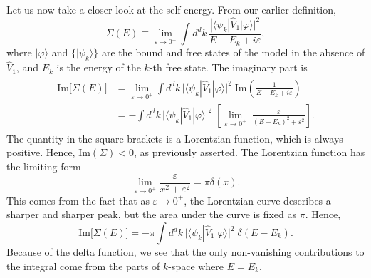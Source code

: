 \documentclass[pra,12pt]{revtex4}
\begin{document}
Let us now take a closer look at the self-energy.  From our earlier
definition,
\begin{equation}
  \Sigma(E) \equiv \lim_{\varepsilon\rightarrow0^+} \int d^dk\, \frac{\displaystyle| \langle\psi_k| \hat{V}_1|\varphi\rangle|^2}{\displaystyle E-E_k+i\varepsilon},
\end{equation}
where $|\varphi\rangle$ and $\{|\psi_k\rangle\}$ are the bound and
free states of the model in the absence of $\hat{V}_1$, and $E_k$ is
the energy of the $k$-th free state.  The imaginary part is
\begin{align}
  \begin{aligned}\mathrm{Im}\big[\Sigma(E)\big] &= \lim_{\varepsilon\rightarrow0^+} \int d^dk\, \Big| \langle\psi_k| \hat{V}_1|\varphi\rangle\Big|^2 \; \mathrm{Im}\left( \frac{1}{\displaystyle E-E_k+i\varepsilon}\right) \\ &= - \int d^dk\, \Big| \langle\psi_k| \hat{V}_1|\varphi\rangle\Big|^2 \; \left[ \lim_{\varepsilon\rightarrow0^+} \; \frac{\varepsilon}{\displaystyle (E-E_k)^2 + \varepsilon^2}\right].\end{aligned}
\end{align}
The quantity in the square brackets is a Lorentzian function, which is
always positive.  Hence, $\mathrm{Im}(\Sigma) < 0$, as previously
asserted.  The Lorentzian function has the limiting form
\begin{equation}
  \lim_{\varepsilon\rightarrow 0^+} \frac{\varepsilon}{x^2+\varepsilon^2} = \pi\delta(x).
\end{equation}
This comes from the fact that as $\varepsilon\rightarrow0^+$, the
Lorentzian curve describes a sharper and sharper peak, but the area
under the curve is fixed as $\pi$.  Hence,
\begin{equation}
  \mathrm{Im}\big[\Sigma(E)\big] = - \pi \int d^dk\, \Big| \langle\psi_k| \hat{V}_1|\varphi\rangle\Big|^2 \; \delta(E-E_k).
\end{equation}
Because of the delta function, we see that the only non-vanishing
contributions to the integral come from the parts of $k$-space where
$E = E_k$.
\end{document}
